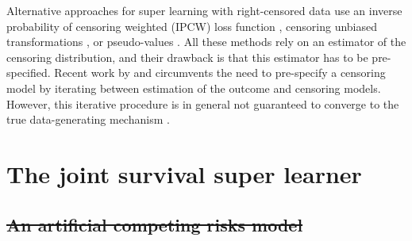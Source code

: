 \documentclass[lineno]{biometrika}
\newcommand{\1}{\mathds{1}}
\providecommand{\DIFdel}[1]{{\protect\color{red}\sout{#1}}}                      %
\providecommand{\DIFaddbegin}{} %
\providecommand{\DIFaddend}{} %
\providecommand{\DIFdelbegin}{} %
\providecommand{\DIFdelend}{} %
\begin{document}
Alternative approaches for super learning with right-censored data use
an inverse probability of censoring weighted (IPCW) loss function
\citep{graf1999assessment,van2003unicv,molinaro2004tree,keles2004asymptotically,hothorn2006survival,gerds2006consistent,gonzalez2021stacked},
censoring unbiased transformations
\citep{fan1996local,steingrimsson2019censoring}, or pseudo-values
\citep{andersen2003generalised,mogensen2013random,sachs2019ensemble}.
All these methods rely on an estimator of the censoring distribution,
and their drawback is that this estimator has to be pre-specified.
Recent work by \cite{han2021inverse} and \cite{westling2021inference}
circumvents the need to pre-specify a censoring model by iterating
between estimation of the outcome and censoring models. However, this
iterative procedure is in general not guaranteed to converge to the
true data-generating mechanism
\citep[][Appendix~A.4]{munch2024thesis}. 


\section{The joint survival super learner}
\DIFdelbegin %

\subsection{\DIFdel{An artificial competing risks model}}
\addtocounter{subsection}{-1}%
\DIFdelend \DIFaddbegin \label{sec:joint-survival-super-learner}
\DIFaddend 
\end{document}
